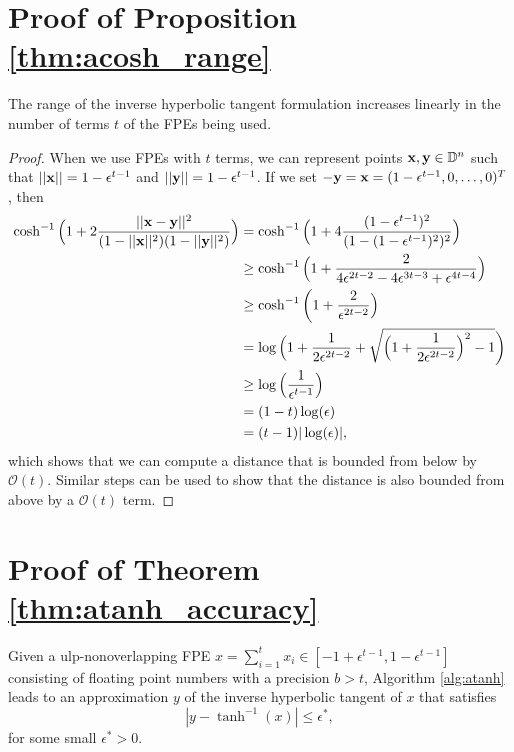 \section{Proof of Proposition \ref{thm:acosh_range}}\label{sec:acosh_range_proof}
\begin{proposition*}
    The range of the inverse hyperbolic tangent formulation increases linearly in the number of terms $t$ of the FPEs being used.
\end{proposition*}

\begin{proof}
    When we use FPEs with $t$ terms, we can represent points $\mathbf{x}, \mathbf{y} \in \mathbb{D}^n$ such that $||\mathbf{x}|| = 1 - \epsilon^{t-1}$ and $||\mathbf{y}|| = 1 - \epsilon^{t-1}$. If we set $-\mathbf{y} = \mathbf{x} = (1 - \epsilon^{t-1}, 0, \ldots, 0)^T$, then 
    \begin{align}
        \cosh^{-1} \Big( 1 + 2 \frac{||\mathbf{x} - \mathbf{y}||^2}{(1 - ||\mathbf{x}||^2) (1 - ||\mathbf{y}||^2)} \Big) &= \cosh^{-1} \Big( 1 + 4 \frac{(1 - \epsilon^{t-1})^2}{(1 - (1 - \epsilon^{t-1})^2)^2} \Big) \\
        &\geq \cosh^{-1} \Big( 1 + \frac{2}{4\epsilon^{2t - 2} - 4\epsilon^{3t - 3} + \epsilon^{4t-4}} \Big) \\
        &\geq \cosh^{-1} \bigg( 1 + \frac{2}{\epsilon^{2t-2}} \Big) \\
        &= \log \Big( 1 + \frac{1}{2\epsilon^{2t - 2}} + \sqrt{\Big(1 + \frac{1}{2\epsilon^{2t - 2}}\Big)^2 - 1} \bigg) \\
        &\geq \log \Big( \frac{1}{\epsilon^{t-1}} \Big) \\
        &= (1 - t) \log (\epsilon) \\
        &= (t - 1) |\log(\epsilon)|,
    \end{align}
    which shows that we can compute a distance that is bounded from below by $\mathcal{O}(t)$. Similar steps can be used to show that the distance is also bounded from above by a $\mathcal{O}(t)$ term.
\end{proof}

\section{Proof of Theorem \ref{thm:atanh_accuracy}}
\label{sec:atanh_accuracy_proof}

\begin{theorem*}
    Given a ulp-nonoverlapping FPE $x = \sum_{i=1}^t x_i \in [-1 + \epsilon^{t - 1}, 1 - \epsilon^{t - 1}]$ consisting of floating point numbers with a precision $b > t$, Algorithm \ref{alg:atanh} leads to an approximation $y$ of the inverse hyperbolic tangent of $x$ that satisfies
    \begin{equation}
        |y - \tanh^{-1} (x)| \leq \epsilon^*,
    \end{equation}
    for some small $\epsilon^* > 0$.
\end{theorem*}

